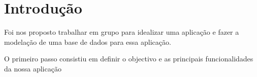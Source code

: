 \section{Introdução} \label{section: Introducao}
Foi nos proposto trabalhar em grupo para idealizar uma aplicação e fazer a modelação de uma base de dados para essa aplicação.
\par \vspace{6pt}
O primeiro passo consistiu em definir o objectivo e as principais funcionalidades da nossa aplicação

\vspace{10pt}
